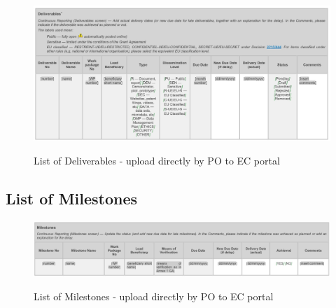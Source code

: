 \begin{figure}[h]
    \centering
    \caption{List of Deliverables - upload directly by PO to EC portal}
    \includegraphics[height=0.7\hsize]{graphics/deliverables.jpg}
    \label{fig:enter-label}
\end{figure}
\newpage

\subsection*{List of Milestones}
\begin{figure}[h]
    \centering
    \caption{List of Milestones - upload directly by PO to EC portal}
    \includegraphics[width=\vsize]{graphics/milestones.jpg}
    \label{fig:enter-label}
\end{figure}
\newpage
